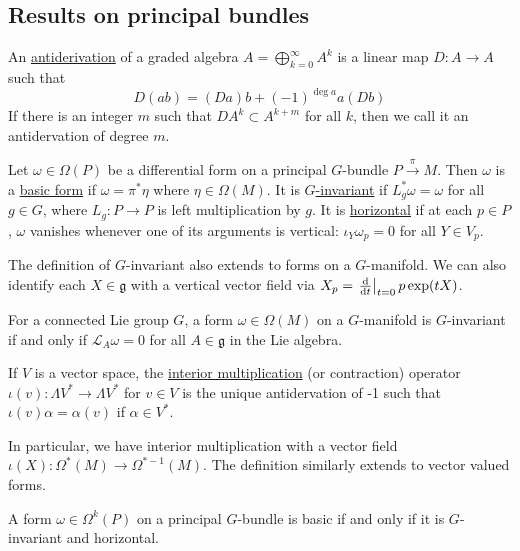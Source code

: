 \subsection{Results on principal bundles}
\begin{defn} \label{defn:antiderivation}%
	An \underline{antiderivation} of a graded algebra $A=\bigoplus_{k=0}^\infty
	A^k$ is a linear map $D : A\to A$ such that 
	\[ 
	D(ab) = (Da)b + (-1)^{\deg a} a(Db)
	\] 
	If there is an integer $m$ such that  $D A^k \subset A^{k+m}$ for all $k$,
	then we call it an antidervation of degree  $m$.
\end{defn}
\begin{defn} 
	Let  $\omega\in \Omega(P)$ be a differential form on a principal $G$-bundle
	$P\xrightarrow{\pi} M$. 
	Then $\omega$ is a \underline{basic form} if  $\omega = \pi^*\eta$
	where  $\eta\in\Omega(M)$. 
	It is \underline{$G$-invariant} if $L^*_g \omega =\omega$ for all  $g\in G$,
	where $L_g : P\to P$ is left multiplication by  $g$.
	It is \underline{horizontal} if at each $p\in P$,
    $\omega$ vanishes whenever one of its arguments is vertical:
	$\iota_Y\omega_p = 0$ for all  $Y\in V_p$.
\end{defn}
\noindent
The definition of $G$-invariant also extends to forms on a  $G$-manifold. 
We can also identify each $X\in \mathfrak{g}$ with 
a vertical vector field via $X_p = \odv{}{t}_{t=0} p \exp (t X)$. 
\begin{thm} %
	\label{thm:lie_invariant}
	For a connected Lie group $G$, a form $\omega\in \Omega(M)$ on a 
	 $G$-manifold is  $G$-invariant if and only if  $\mathcal{L}_A\omega=0$ for
	 all $A\in\mathfrak{g}$ in the Lie algebra.
\end{thm}
\begin{defn} \label{def:contraction} %
	If $V$ is a vector space, the \underline{interior multiplication} (or 
	contraction) operator $\iota(v) :
	\Lambda V^* \to \Lambda V^*$ for $v\in V$ is the unique antidervation of -1 
	such that $\iota(v)\alpha = \alpha(v)$ if  $\alpha\in V^*$.
\end{defn}
\noindent
In particular, we have interior multiplication with a vector
field $\iota(X) : \Omega^*(M) \to \Omega^{*-1}(M)$.
The definition similarly extends to vector valued forms.

\begin{thm} %
	A form  $\omega\in\Omega^k(P)$ on a principal $G$-bundle is 
	basic if and only if it is $G$-invariant and horizontal.
\end{thm}

